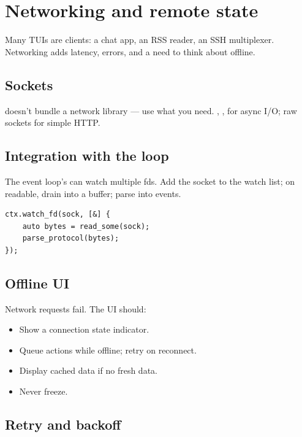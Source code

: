 \chapter{Networking and remote state}
\label{ch:networking}

\begin{aside}
Many TUIs are clients: a chat app, an RSS reader, an SSH
multiplexer. Networking adds latency, errors, and a need to
think about offline.
\end{aside}

\section{Sockets}

\maya{} doesn't bundle a network library --- use what you
need. , ,  for
async I/O; raw sockets for simple HTTP.

\section{Integration with the loop}

The event loop's  can watch multiple fds. Add
the socket to the watch list; on readable, drain into a
buffer; parse into events.

\begin{lstlisting}
ctx.watch_fd(sock, [&] {
    auto bytes = read_some(sock);
    parse_protocol(bytes);
});
\end{lstlisting}

\section{Offline UI}

Network requests fail. The UI should:

\begin{itemize}[leftmargin=*]
  \item Show a connection state indicator.
  \item Queue actions while offline; retry on reconnect.
  \item Display cached data if no fresh data.
  \item Never freeze.
\end{itemize}

\section{Retry and backoff}

